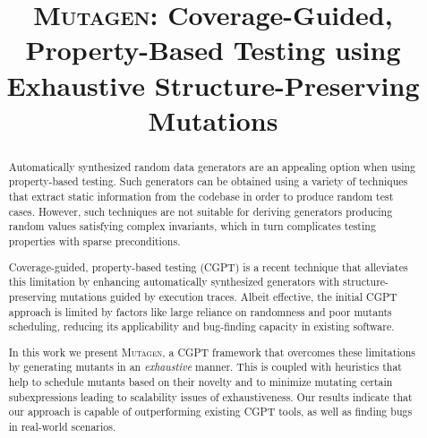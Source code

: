 \documentclass[sigconf, anonymous, review]{acmart}
\newcommand{\mutagen}{\textsc{Mutagen}\xspace}
\begin{document}
\title[\mutagen]{\mutagen: Coverage-Guided, Property-Based Testing using
  Exhaustive Structure-Preserving Mutations}









\begin{abstract}
Automatically synthesized random data generators are an appealing option when
using property-based testing.
%
Such generators can be obtained using a variety of techniques that extract
static information from the codebase in order to produce random test cases.
%
However, such techniques are not suitable for deriving generators producing
random values satisfying complex invariants, which in turn complicates testing
properties with sparse preconditions.


Coverage-guided, property-based testing (CGPT) is a recent technique that
alleviates this limitation by enhancing automatically synthesized generators
with structure-preserving mutations guided by execution traces.
%
Albeit effective, the initial CGPT approach is limited by factors like large
reliance on randomness and poor mutants scheduling, reducing its applicability
and bug-finding capacity in existing software.


In this work we present \mutagen, a CGPT framework that overcomes these
limitations by generating mutants in an \emph{exhaustive} manner.
%
This is coupled with heuristics that help to schedule mutants based on their
novelty and to minimize mutating certain subexpressions leading to scalability issues of
exhaustiveness.
%
Our results indicate that our approach is capable of outperforming existing CGPT
tools, as well as finding bugs in real-world scenarios.
\end{abstract}
\end{document}
